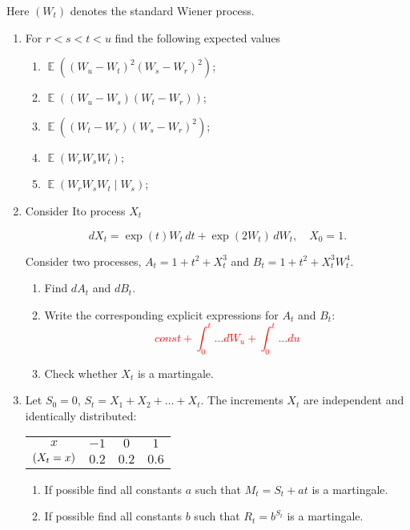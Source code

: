 \documentclass[12pt]{article}
\let\P\relax
\DeclareMathOperator{\P}{\mathbb{P}}
\DeclareMathOperator{\E}{\mathbb{E}}
\begin{document}
Here $(W_t)$ denotes the standard Wiener process.

\begin{enumerate}
    
    
    
    \item For $r<s<t<u$ find the following expected values 
    \begin{enumerate}
    \item $\E((W_u - W_t)^2(W_s - W_r)^2)$;
    \item $\E((W_u - W_s)(W_t - W_r))$;
    \item $\E((W_t - W_r)(W_s - W_r)^2)$;
    \item $\E(W_r W_s W_t)$;
    \item $\E(W_r W_s W_t \mid W_s)$;
    \end{enumerate}

\item Consider Ito process $X_t$

\[
dX_t = \exp(t) W_t\, dt + \exp(2W_t) \, dW_t, \quad X_0 = 1.
\]

Consider two processes, $A_t = 1 + t^2 + X_t^3$ and $B_t = 1 + t^2 + X_t^3 W_t^4$.

\begin{enumerate}
    \item Find $dA_t$ and $dB_t$.
    \item Write the corresponding explicit expressions for $A_t$ and $B_t$:
    \textcolor{red}{
    \[
    const + \int_0^t \ldots dW_u + \int_0^t \ldots du
    \]
    }
    \item Check whether $X_t$ is a martingale.
\end{enumerate}

\item Let $S_0 = 0$, $S_t = X_1 + X_2 + \ldots + X_t$. The increments $X_t$ are independent and identically distributed: 

\begin{tabular}{cccc}
\toprule
$x$ & $-1$ & $0$ & $1$ \\
$\P(X_t = x)$ & $0.2$ & $0.2$ & $0.6$ \\
\bottomrule
\end{tabular}

\begin{enumerate}
    \item If possible find all constants $a$ such that $M_t = S_t + at$ is a martingale.
  \item If possible find all constants $b$ such that $R_t = b^{S_t}$ is a martingale.
\end{enumerate}


\end{enumerate}
\end{document}
